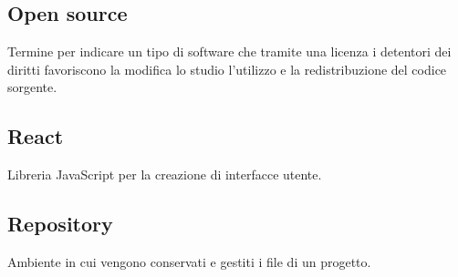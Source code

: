     \subsection{Open source}
    Termine per indicare un tipo di software che tramite una licenza i detentori dei diritti favoriscono
    la modifica lo studio l’utilizzo e la redistribuzione del codice sorgente.

    \subsection{React}
    Libreria JavaScript per la creazione di interfacce utente.

    \subsection{Repository}
    Ambiente in cui vengono conservati e gestiti i file di un progetto.
